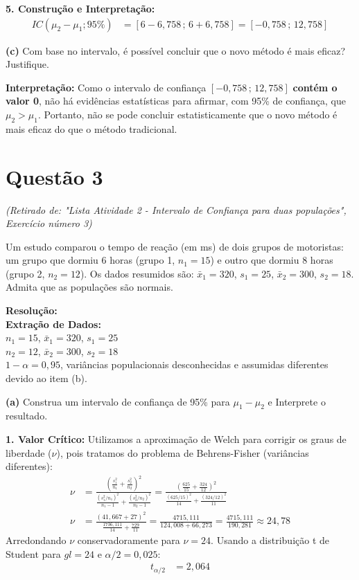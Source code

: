 \documentclass[12pt, a4paper]{article}
\begin{document}
\noindent \textbf{5. Construção e Interpretação:}
\begin{align*}
IC(\mu_2 - \mu_1; 95\%) &= [6 - 6,758 \,;\, 6 + 6,758] = \boxed{[-0,758 \,;\, 12,758]}
\end{align*}

\medskip\noindent\textbf{(c)} Com base no intervalo, é possível concluir que o novo método é mais eficaz? Justifique.

\noindent \textbf{Interpretação:} Como o intervalo de confiança $[-0,758 \,;\, 12,758]$ \textbf{contém o valor 0}, não há evidências estatísticas para afirmar, com 95\% de confiança, que $\mu_2 > \mu_1$. Portanto, não se pode concluir estatisticamente que o novo método é mais eficaz do que o método tradicional.

\section*{Questão 3}
\textit{(Retirado de: "Lista Atividade 2 - Intervalo de Confiança para duas populações", Exercício número 3)}

Um estudo comparou o tempo de reação (em ms) de dois grupos de motoristas: um grupo que dormiu 6 horas (grupo 1, $n_1 = 15$) e outro que dormiu 8 horas (grupo 2, $n_2 = 12$). Os dados resumidos são:
$\bar{x}_1 = 320$, $s_1 = 25$, $\bar{x}_2 = 300$, $s_2 = 18$.
Admita que as populações são normais.

\vspace{0.3cm}
\noindent\textbf{Resolução:}\\
\textbf{Extração de Dados:} \\
$n_1 = 15$, $\bar{x}_1 = 320$, $s_1 = 25$ \\
$n_2 = 12$, $\bar{x}_2 = 300$, $s_2 = 18$ \\
$1-\alpha = 0,95$, variâncias populacionais desconhecidas e assumidas diferentes devido ao item (b).

\medskip\noindent\textbf{(a)} Construa um intervalo de confiança de 95\% para $\mu_1 - \mu_2$ e Interprete o resultado.

\noindent \textbf{1. Valor Crítico:} Utilizamos a aproximação de Welch para corrigir os graus de liberdade ($\nu$), pois tratamos do problema de Behrens-Fisher (variâncias diferentes):
\begin{align*}
\nu &= \frac{\left(\frac{s_1^2}{n_1} + \frac{s_2^2}{n_2}\right)^2}{\frac{(s_1^2/n_1)^2}{n_1-1} + \frac{(s_2^2/n_2)^2}{n_2-1}} = \frac{\left(\frac{625}{15} + \frac{324}{12}\right)^2}{\frac{(625/15)^2}{14} + \frac{(324/12)^2}{11}} \\
\nu &= \frac{(41,667 + 27)^2}{\frac{1736,111}{14} + \frac{729}{11}} = \frac{4715,111}{124,008 + 66,273} = \frac{4715,111}{190,281} \approx 24,78
\end{align*}
Arredondando $\nu$ conservadoramente para $\nu = 24$. Usando a distribuição t de Student para $gl=24$ e $\alpha/2 = 0,025$:
\begin{align*}
t_{\alpha/2} &= \boxed{2,064}
\end{align*}
\end{document}
